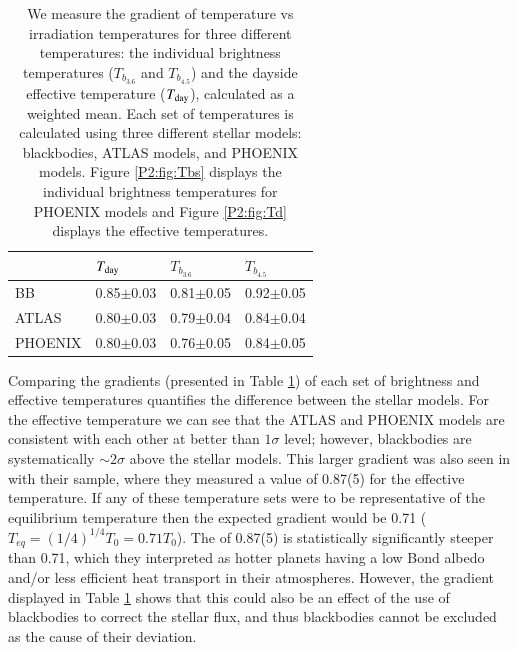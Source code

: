 \begin{subappendices}
\begin{table}[]
    \caption{We measure the gradient of temperature vs irradiation temperatures for three different temperatures: the individual brightness temperatures ($T_{b_{3.6}}$ and $T_{b_{4.5}}$) and the dayside effective temperature ($T_{\rm day}$), calculated as a weighted mean. Each set of temperatures is calculated using three different stellar models: blackbodies, ATLAS models, and PHOENIX models. Figure \ref{P2:fig:Tbs} displays the individual brightness temperatures for PHOENIX models and Figure \ref{P2:fig:Td} displays the effective temperatures.}
    \centering
    \begin{tabular}{l l l l }
    \hline\hline
          &   $T_{\rm day}$     & $T_{b_{3.6}}$ & $T_{b_{4.5}}$ \\
    \hline
    BB    &   0.85$\pm$0.03 & 0.81$\pm$0.05 & 0.92$\pm$0.05 \\
    ATLAS &   0.80$\pm$0.03 & 0.79$\pm$0.04 & 0.84$\pm$0.04\\
    PHOENIX & 0.80$\pm$0.03 & 0.76$\pm$0.05 & 0.84$\pm$0.05 \\
    \hline
    \end{tabular}

    \label{P2:tab:slopes}
\end{table}

Comparing the gradients (presented in Table \ref{P2:tab:slopes}) of each set of brightness and effective temperatures quantifies the difference between the stellar models. For the effective temperature we can see that the ATLAS and PHOENIX models are consistent with each other at better than $1\sigma$ level; however, blackbodies are systematically $\sim2\sigma$ above the stellar models. This larger gradient was also seen in \citet{Schwartz2015} with their sample, where they measured a value of 0.87(5) for the effective temperature. If any of these temperature sets were to be representative of the equilibrium temperature then the expected gradient would be 0.71 ($T_{eq} = (1/4)^{1/4}T_0 = 0.71 T_0$). The \citet{Schwartz2015} of 0.87(5) is statistically significantly steeper than 0.71, which they interpreted as hotter planets having a low Bond albedo and/or less efficient heat transport in their atmospheres. However, the gradient displayed in Table \ref{P2:tab:slopes} shows that this could also be an effect of the use of blackbodies to correct the stellar flux, and thus blackbodies cannot be excluded as the cause of their deviation.


\end{subappendices}

